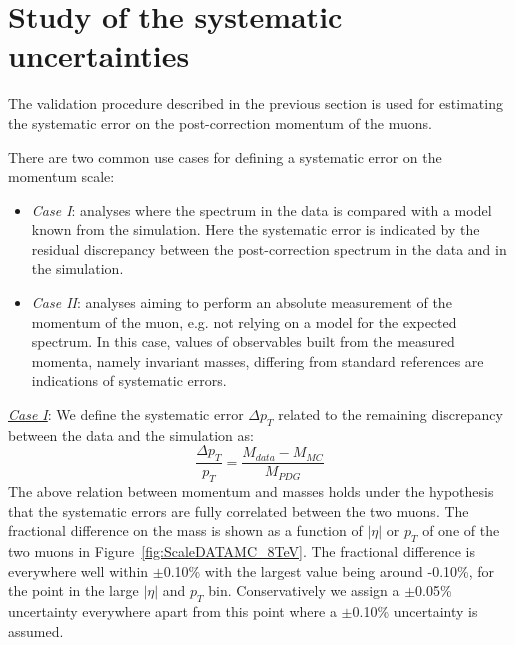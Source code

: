 \section{Study of the systematic uncertainties}
\label{sec:systematics}
The validation procedure described in the previous section is used for
estimating the systematic error on the post-correction momentum of the muons.

There are two common use cases for defining a systematic
error on the momentum scale: 
\begin{itemize}
\item {\sl Case I}: analyses where the spectrum in the data is compared
  with a model known from the simulation. Here the systematic error is
  indicated by the residual
  discrepancy between the post-correction
  spectrum in the data and in the simulation.
\item {\sl Case II}: analyses aiming to perform an absolute measurement of the
  momentum of the muon, e.g. not relying on a model for the
  expected spectrum. In this case, values of observables built from the measured
  momenta, namely invariant masses, differing from standard
  references are indications of systematic errors. 
\end{itemize}

\underline{\sl Case I}: We define the systematic error  $\Delta p_T$ related to the remaining discrepancy between
the data and the simulation as:
\begin{equation}
  \frac{\Delta p_T}{p_T}=\frac{M_{data}-M_{MC}}{M_{PDG}}
  \label{eq:syst_DATA_MC}
\end{equation}
The above relation between momentum
and masses holds under the hypothesis that the systematic errors are fully correlated between the two muons. 
The fractional difference on the mass is shown as a function of $|\eta|$ or $p_T$ of one of the two muons in
Figure~\ref{fig:ScaleDATAMC_8TeV}.
The fractional difference is everywhere well within $\pm$0.10\% with the largest value
being around -0.10\%, for the point in the large $|\eta|$ and $p_T$ bin.
Conservatively we assign a $\pm$0.05\% uncertainty everywhere apart from this
point where a $\pm$0.10\% uncertainty is assumed. 

